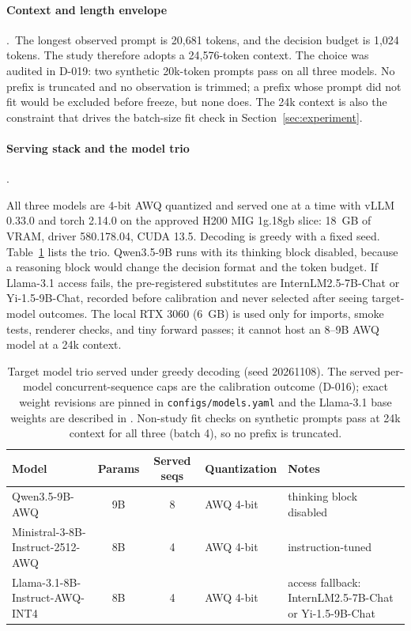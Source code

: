 \documentclass[a4paper,fleqn]{cas-sc}
\begin{document}
\paragraph{Context and length envelope}.\
The longest observed prompt is 20{,}681 tokens, and the decision budget is 1{,}024 tokens. The
study therefore adopts a 24{,}576-token context. The choice was audited in D-019: two synthetic
20k-token prompts pass on all three models. No prefix is truncated and no observation is
trimmed; a prefix whose prompt did not fit would be excluded before freeze, but none does. The
24k context is also the constraint that drives the batch-size fit check in
Section~\ref{sec:experiment}.

\paragraph{Serving stack and the model trio}.\

All three models are 4-bit AWQ quantized \cite{awq} and served one at a time with vLLM 0.33.0
\cite{vllm} and torch 2.14.0 on the approved H200 MIG 1g.18gb slice: 18~GB of VRAM, driver
580.178.04, CUDA 13.5.
Decoding is greedy with a fixed seed. Table~\ref{tab:models} lists the trio. Qwen3.5-9B runs with
its thinking block disabled, because a reasoning block would change the decision format and the
token budget. If Llama-3.1 access fails, the pre-registered substitutes are InternLM2.5-7B-Chat
or Yi-1.5-9B-Chat, recorded before calibration and never selected after seeing target-model
outcomes. The local RTX 3060 (6~GB) is used only for imports, smoke tests, renderer checks, and
tiny forward passes; it cannot host an 8--9B AWQ model at a 24k context.

\begin{table}[pos=htbp]
  \centering
  \caption{Target model trio served under greedy decoding (seed 20261108). The served
  per-model concurrent-sequence caps are the calibration outcome (D-016); exact weight
  revisions are pinned in \texttt{configs/models.yaml} and the Llama-3.1 base weights are
  described in \cite{llamaherd}. Non-study fit checks on synthetic prompts pass at 24k
  context for all three (batch 4), so no prefix is truncated.}
  \label{tab:models}
  \small
  \begin{tabular}{>{\raggedright\arraybackslash}p{4.9cm}cc>{\raggedright\arraybackslash}p{2.0cm}>{\raggedright\arraybackslash}p{3.9cm}}
    \toprule
    \textbf{Model} & \textbf{Params} & \textbf{Served seqs} & \textbf{Quantization} & \textbf{Notes} \\
    \midrule
    Qwen3.5-9B-AWQ                        & 9B & 8 & AWQ 4-bit & thinking block disabled \\
    Ministral-3-8B-Instruct-2512-AWQ      & 8B & 4 & AWQ 4-bit & instruction-tuned \\
    Llama-3.1-8B-Instruct-AWQ-INT4        & 8B & 4 & AWQ 4-bit & access fallback: InternLM2.5-7B-Chat or Yi-1.5-9B-Chat \\
    \bottomrule
  \end{tabular}
\end{table}
\end{document}
